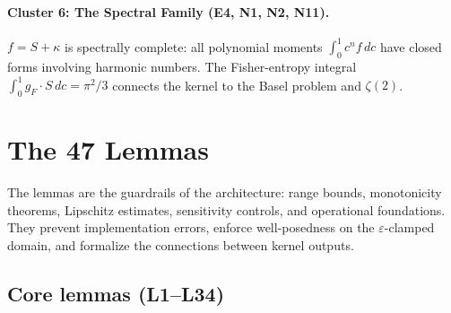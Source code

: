 \documentclass[
  aps,
  prd,
  twocolumn,
  superscriptaddress,
  nofootinbib,
  floatfix
]{revtex4-2}
\newcommand{\eps}{\varepsilon}
\newcommand{\gF}{g_{\!F}}
\begin{document}
\paragraph{Cluster 6: The Spectral Family (E4, N1, N2, N11).}
$f = S + \kappa$ is spectrally complete: all polynomial moments
$\int_0^1 c^n f\,dc$ have closed forms involving harmonic numbers.
The Fisher-entropy integral $\int_0^1 \gF \cdot S\,dc = \pi^2/3$
connects the kernel to the Basel problem and $\zeta(2)$.


\section{The 47 Lemmas}\label{sec:lemmas}

The lemmas are the guardrails of the architecture: range bounds,
monotonicity theorems, Lipschitz estimates, sensitivity controls,
and operational foundations.  They prevent implementation errors,
enforce well-posedness on the $\eps$-clamped domain, and formalize
the connections between kernel outputs.

\subsection{Core lemmas (L1--L34)}
\end{document}
